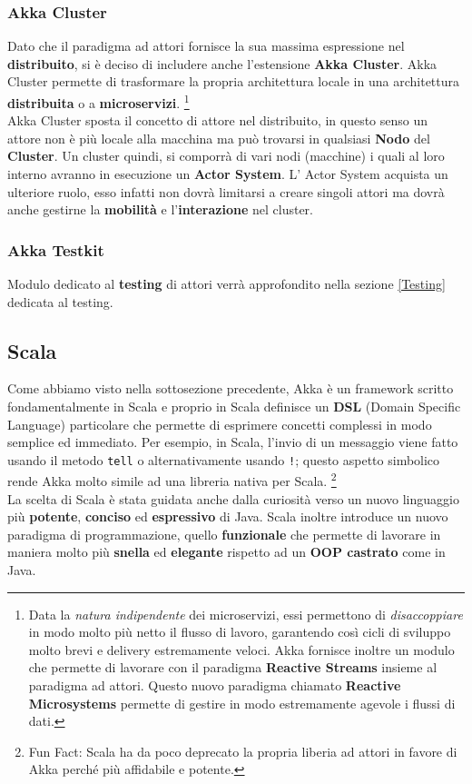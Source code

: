   \subsubsection{Akka Cluster}
  Dato che il paradigma ad attori fornisce la sua massima espressione nel \textbf{distribuito}, si è deciso di includere anche l'estensione \textbf{Akka Cluster}. Akka Cluster permette di trasformare la propria architettura locale in una architettura \textbf{distribuita} o a  \textbf{microservizi}.
  \footnote{ Data la \textit{natura indipendente} dei microservizi, essi permettono di \textit{disaccoppiare} in modo molto più netto il flusso di lavoro, garantendo così cicli di sviluppo molto brevi e delivery estremamente veloci. Akka fornisce inoltre un modulo che permette di lavorare con il paradigma \textbf{Reactive Streams} insieme al paradigma ad attori. Questo nuovo paradigma chiamato \textbf{Reactive Microsystems} permette di gestire in modo estremamente agevole i flussi di dati.}\\
  Akka Cluster sposta il concetto di attore nel distribuito, in questo senso un attore non è più locale alla macchina ma può trovarsi in qualsiasi \textbf{Nodo} del \textbf{Cluster}. Un cluster quindi, si comporrà di vari nodi (macchine) i quali al loro interno avranno in esecuzione un \textbf{Actor System}. L' Actor System acquista un ulteriore ruolo, esso infatti non dovrà limitarsi a creare singoli attori ma dovrà anche gestirne la \textbf{mobilità} e l'\textbf{interazione} nel cluster.
  \subsubsection{Akka Testkit}
  Modulo dedicato al \textbf{testing} di attori verrà approfondito nella sezione \ref{Testing} dedicata al testing.

\subsection{Scala}
Come abbiamo visto nella sottosezione precedente, Akka è un framework scritto fondamentalmente in Scala e proprio in Scala definisce un \textbf{DSL} (Domain Specific Language) particolare che permette di esprimere concetti complessi in modo semplice ed immediato. Per esempio, in Scala, l'invio di un messaggio viene fatto usando il metodo \texttt{tell} o alternativamente usando \texttt{!}; questo aspetto simbolico rende Akka molto simile ad una libreria nativa per Scala.
\footnote{Fun Fact: Scala ha da poco deprecato la propria liberia ad attori in favore di Akka perché più affidabile e potente.}\\
La scelta di Scala è stata guidata anche dalla curiosità verso un nuovo linguaggio più \textbf{potente}, \textbf{conciso} ed \textbf{espressivo} di Java. Scala inoltre introduce un nuovo paradigma di programmazione, quello \textbf{funzionale} che permette di lavorare in maniera molto più \textbf{snella} ed \textbf{elegante} rispetto ad un \textbf{OOP castrato} come in Java.


